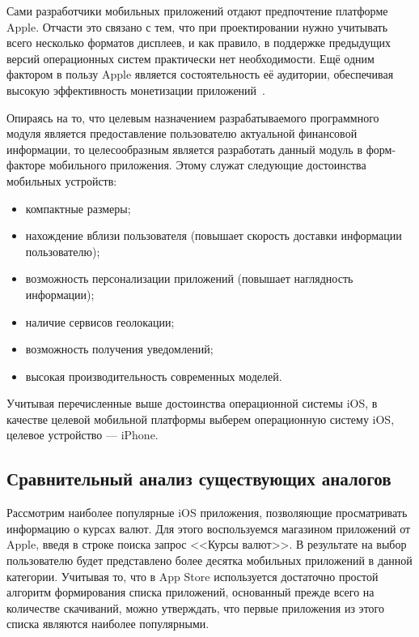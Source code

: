 Сами разработчики мобильных приложений отдают предпочтение платформе Apple.
Отчасти это связано с тем, что при проектировании нужно учитывать всего
несколько форматов дисплеев, и как правило, в поддержке предыдущих
версий операционных систем практически нет необходимости.
Ещё одним фактором в пользу Apple является состоятельность её аудитории,
обеспечивая высокую эффективность монетизации приложений~\cite{ios_android_compare}.



Опираясь на то, что целевым назначением разрабатываемого программного модуля
является предоставление пользователю актуальной финансовой информации,
то целесообразным является разработать данный модуль в форм-факторе мобильного
приложения.
Этому служат следующие достоинства мобильных устройств:
\begin{itemize}
  \item компактные размеры;
  \item нахождение вблизи пользователя (повышает скорость доставки
    информации пользователю);
  \item возможность персонализации приложений (повышает наглядность информации);
  \item наличие сервисов геолокации;
  \item возможность получения уведомлений;
  \item высокая производительность современных моделей.
\end{itemize}

Учитывая перечисленные выше достоинства операционной системы iOS, в качестве
целевой мобильной платформы выберем операционную систему iOS,
целевое устройство --- iPhone.



\subsection{Сравнительный анализ существующих аналогов}
\label{subs:compare_equivalents}

Рассмотрим наиболее популярные iOS приложения, позволяющие просматривать
информацию о курсах валют. Для этого воспользуемся магазином приложений от Apple,
введя в строке поиска запрос <<Курсы валют>>. В результате на выбор
пользователю будет представлено более десятка мобильных приложений в данной
категории. Учитывая то, что в App Store используется достаточно
простой алгоритм формирования списка приложений, основанный прежде всего на
количестве скачиваний, можно утверждать, что первые приложения из этого списка
являются наиболее популярными.

